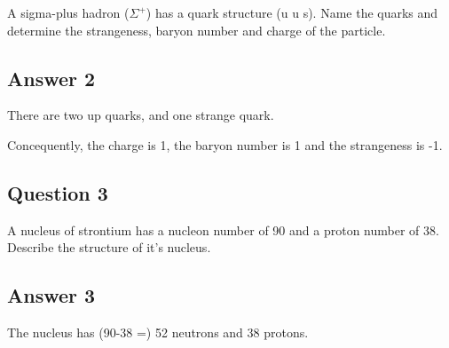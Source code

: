 \documentclass{article}
\begin{document}
A sigma-plus hadron ($\Sigma^+$) has a quark structure (u u s). Name the quarks
and determine the strangeness, baryon number and charge of the particle.

\subsection*{Answer 2}

There are two up quarks, and one strange quark.

Concequently, the charge is 1, the baryon number is 1 and the strangeness is -1.

\subsection*{Question 3}

A nucleus of strontium has a nucleon number of 90 and a proton number of 38.
Describe the structure of it's nucleus.

\subsection*{Answer 3}

The nucleus has (90-38 =) 52 neutrons and 38 protons.
\end{document}
